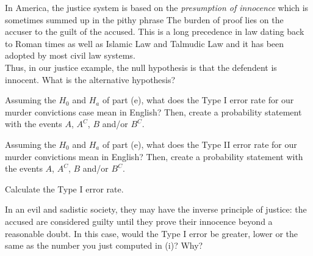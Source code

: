 \documentclass[12pt]{article}
\begin{document}
 In America, the justice system is based on the \textit{presumption of innocence} which is sometimes summed up in the pithy phrase  The burden of proof lies on the accuser to  the guilt of the accused. This is a long precedence in law dating back to Roman times as well as Islamic Law and Talmudic Law and it has been adopted by most civil law systems. \\ 

Thus, in our justice example, the null hypothesis is that the defendent is innocent. What is the alternative hypothesis? 

 Assuming the $H_0$ and $H_a$ of part (e), what does the Type I error rate for our murder convictions case mean in English? Then, create a probability statement with the events $A$, $A^C$, $B$ and/or $B^C$.

 Assuming the $H_0$ and $H_a$ of part (e), what does the Type II error rate for our murder convictions mean in English? Then, create a probability statement with the events $A$, $A^C$, $B$ and/or $B^C$.

 Calculate the Type I error rate. 


 In an evil and sadistic society, they may have the inverse principle of justice: the accused are considered guilty until they prove their innocence beyond a reasonable doubt. In this case, would the Type I error be greater, lower or the same as the number you just computed in (i)? Why?


\eenum
\end{document}
